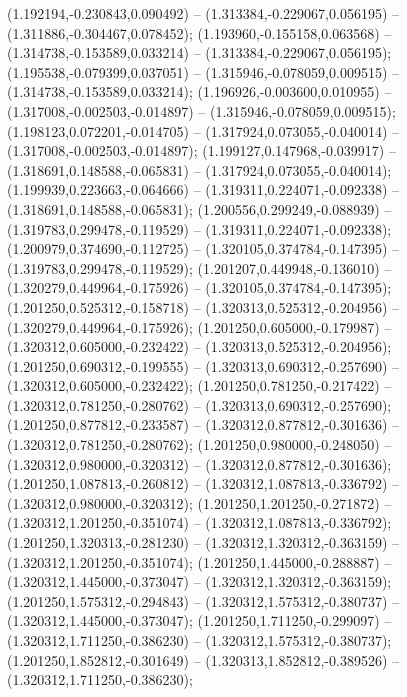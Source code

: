  (1.192194,-0.230843,0.090492) -- (1.313384,-0.229067,0.056195) -- (1.311886,-0.304467,0.078452);
 (1.193960,-0.155158,0.063568) -- (1.314738,-0.153589,0.033214) -- (1.313384,-0.229067,0.056195);
 (1.195538,-0.079399,0.037051) -- (1.315946,-0.078059,0.009515) -- (1.314738,-0.153589,0.033214);
 (1.196926,-0.003600,0.010955) -- (1.317008,-0.002503,-0.014897) -- (1.315946,-0.078059,0.009515);
 (1.198123,0.072201,-0.014705) -- (1.317924,0.073055,-0.040014) -- (1.317008,-0.002503,-0.014897);
 (1.199127,0.147968,-0.039917) -- (1.318691,0.148588,-0.065831) -- (1.317924,0.073055,-0.040014);
 (1.199939,0.223663,-0.064666) -- (1.319311,0.224071,-0.092338) -- (1.318691,0.148588,-0.065831);
 (1.200556,0.299249,-0.088939) -- (1.319783,0.299478,-0.119529) -- (1.319311,0.224071,-0.092338);
 (1.200979,0.374690,-0.112725) -- (1.320105,0.374784,-0.147395) -- (1.319783,0.299478,-0.119529);
 (1.201207,0.449948,-0.136010) -- (1.320279,0.449964,-0.175926) -- (1.320105,0.374784,-0.147395);
 (1.201250,0.525312,-0.158718) -- (1.320313,0.525312,-0.204956) -- (1.320279,0.449964,-0.175926);
 (1.201250,0.605000,-0.179987) -- (1.320312,0.605000,-0.232422) -- (1.320313,0.525312,-0.204956);
 (1.201250,0.690312,-0.199555) -- (1.320313,0.690312,-0.257690) -- (1.320312,0.605000,-0.232422);
 (1.201250,0.781250,-0.217422) -- (1.320312,0.781250,-0.280762) -- (1.320313,0.690312,-0.257690);
 (1.201250,0.877812,-0.233587) -- (1.320312,0.877812,-0.301636) -- (1.320312,0.781250,-0.280762);
 (1.201250,0.980000,-0.248050) -- (1.320312,0.980000,-0.320312) -- (1.320312,0.877812,-0.301636);
 (1.201250,1.087813,-0.260812) -- (1.320312,1.087813,-0.336792) -- (1.320312,0.980000,-0.320312);
 (1.201250,1.201250,-0.271872) -- (1.320312,1.201250,-0.351074) -- (1.320312,1.087813,-0.336792);
 (1.201250,1.320313,-0.281230) -- (1.320312,1.320312,-0.363159) -- (1.320312,1.201250,-0.351074);
 (1.201250,1.445000,-0.288887) -- (1.320312,1.445000,-0.373047) -- (1.320312,1.320312,-0.363159);
 (1.201250,1.575312,-0.294843) -- (1.320312,1.575312,-0.380737) -- (1.320312,1.445000,-0.373047);
 (1.201250,1.711250,-0.299097) -- (1.320312,1.711250,-0.386230) -- (1.320312,1.575312,-0.380737);
 (1.201250,1.852812,-0.301649) -- (1.320313,1.852812,-0.389526) -- (1.320312,1.711250,-0.386230);
